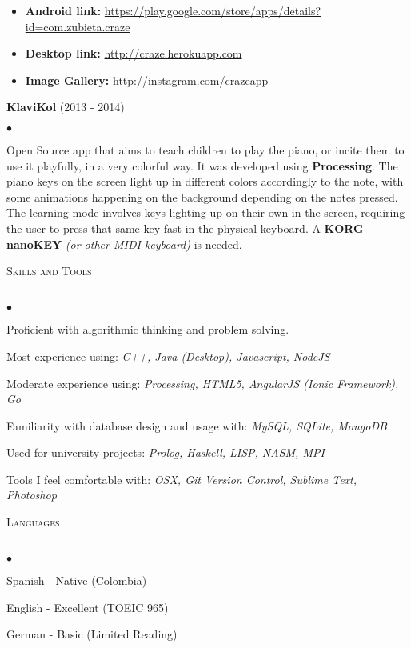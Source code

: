 \documentclass{article}
\newcommand{\lineunder}{\vspace*{-8pt} \\ \hspace*{-18pt} \hrulefill \\}
\newcommand{\header}[1]{{\hspace*{-15pt}\vspace*{6pt}
    \textsc{#1}} \vspace*{-6pt} \lineunder}
\newenvironment{achievements}{\begin{list}{$\bullet$}{\topsep 2pt \itemsep
      -2pt}}{\vspace*{5pt}\end{list}}
\begin{document}
\vspace*{-10pt}
\begin{itemize}
  \item \textbf{Android link:} \url{https://play.google.com/store/apps/details?id=com.zubieta.craze}
  \item \textbf{Desktop link:} \url{http://craze.herokuapp.com}
  \item \textbf{Image Gallery:} \url{http://instagram.com/crazeapp}
\end{itemize} 
\textbf{KlaviKol} (2013 - 2014)
\begin{achievements}
\item Open Source app that aims to teach children to play the piano, or incite them to use it playfully, in a very colorful way. It was developed using \textbf{Processing}. The piano keys on the screen light up in different colors accordingly to the note, with some animations happening on the background depending on the notes pressed. The learning mode involves keys lighting up on their own in the screen, requiring the user to press that same key fast in the physical keyboard. A \textbf{KORG nanoKEY} \textit{(or other MIDI keyboard)} is needed.
\end{achievements}
\header{Skills and Tools}
\vspace*{-14pt}
\begin{achievements}
\item Proficient with algorithmic thinking and problem solving.
\item Most experience using: \textit{C++, Java (Desktop), Javascript, NodeJS}
\item Moderate experience using: \textit{Processing, HTML5, AngularJS (Ionic Framework), Go}
\item Familiarity with database design and usage with: \textit{MySQL, SQLite, MongoDB}
\item Used for university projects: \textit{Prolog, Haskell, LISP, NASM, MPI}
\item Tools I feel comfortable with: \textit{OSX, Git Version Control, Sublime Text, Photoshop}
\end{achievements}
\header{Languages}
\vspace*{-14pt}
\begin{achievements}
\item Spanish - Native (Colombia)
\item English - Excellent (TOEIC 965)
\item German - Basic (Limited Reading)
\end{achievements}
\end{document}
